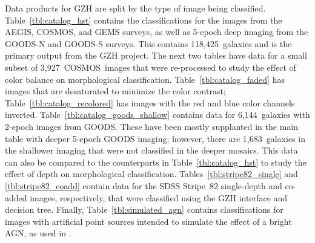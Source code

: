 \documentclass[twocolumn]{aastex6}
\begin{document}
Data products for GZH are split by the type of image being classified. Table~\ref{tbl:catalog_hst} contains the classifications for the \hst{} images from the AEGIS, COSMOS, and GEMS surveys, as well as 5-epoch deep imaging from the GOODS-N and GOODS-S surveys. This contains 118,425~galaxies and is the primary output from the GZH project. The next two tables have data for a small subset of 3,927~COSMOS~images that were re-processed to study the effect of color balance on morphological classification. Table~\ref{tbl:catalog_faded} has images that are desaturated to minimize the color contrast; Table~\ref{tbl:catalog_recolored} has images with the red and blue color channels inverted. Table~\ref{tbl:catalog_goods_shallow} contains data for 6,144~galaxies with 2-epoch images from GOODS. These have been mostly supplanted in the main table with deeper 5-epoch GOODS imaging; however, there are 1,683~galaxies in the shallower imaging that were not classified in the deeper mosaics. This data can also be compared to the counterparts in Table~\ref{tbl:catalog_hst} to study the effect of depth on morphological classification. Tables~\ref{tbl:stripe82_single} and \ref{tbl:stripe82_coadd} contain data for the SDSS Stripe~82 single-depth and co-added images, respectively, that were classified using the GZH interface and decision tree. Finally, Table~\ref{tbl:simulated_agn} contains classifications for images with artificial point sources intended to simulate the effect of a bright AGN, as used in \citet{sim14}.  
\end{document}
